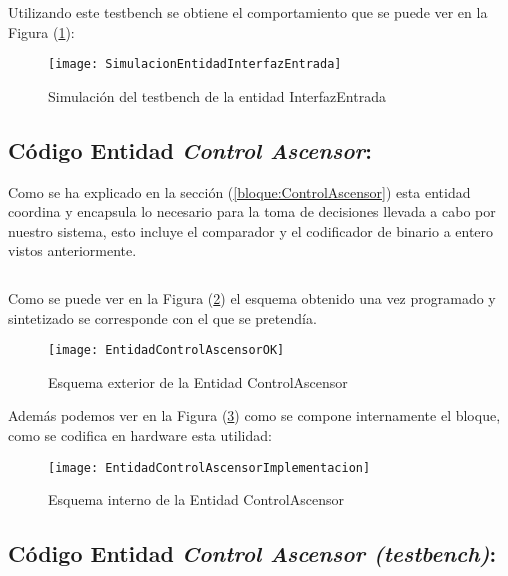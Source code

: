     Utilizando este testbench se obtiene el comportamiento que se puede ver en la Figura (\ref{fig:SimulacionEntidadInterfazEntrada}):

    \begin{figure}[H]
		    \centering
		    \texttt{[image: SimulacionEntidadInterfazEntrada]}
		    \caption{Simulación del testbench de la entidad InterfazEntrada}
		    \label{fig:SimulacionEntidadInterfazEntrada}
	\end{figure}

\subsection{Código Entidad \textit{Control Ascensor}:} \label{code:ControlAscensor}
	Como se ha explicado en la sección (\ref{bloque:ControlAscensor}) esta entidad coordina y encapsula lo necesario para la toma de decisiones llevada a cabo por nuestro sistema, esto incluye el comparador y el codificador de binario a entero vistos anteriormente. \\ 

	\inputminted[frame=lines,fontsize=\footnotesize,linenos]{vhdl}{CodeFiles/EntidadControlAscensor.vhd}

	Como se puede ver en la Figura (\ref{fig:EntidadControlAscensorOK}) el esquema obtenido una vez programado y sintetizado se corresponde con el que se pretendía.
    \begin{figure}[H]
		    \centering
		    \texttt{[image: EntidadControlAscensorOK]}
		    \caption{Esquema exterior de la Entidad ControlAscensor}
		    \label{fig:EntidadControlAscensorOK}
	\end{figure}
    Además podemos ver en la Figura (\ref{fig:EntidadControlAscensorImplementacion}) como se compone internamente el bloque, como se codifica en hardware esta utilidad:
    \begin{figure}[H]
		    \centering
		    \texttt{[image: EntidadControlAscensorImplementacion]}
		    \caption{Esquema interno de la Entidad ControlAscensor}
		    \label{fig:EntidadControlAscensorImplementacion}
	\end{figure}

\subsection{Código Entidad \textit{Control Ascensor (testbench)}:} \label{code:ControlAscensor_tb}
	\inputminted[frame=lines,fontsize=\footnotesize,linenos]{vhdl}{CodeFiles/EntidadControlAscensor_tb.vhd}


